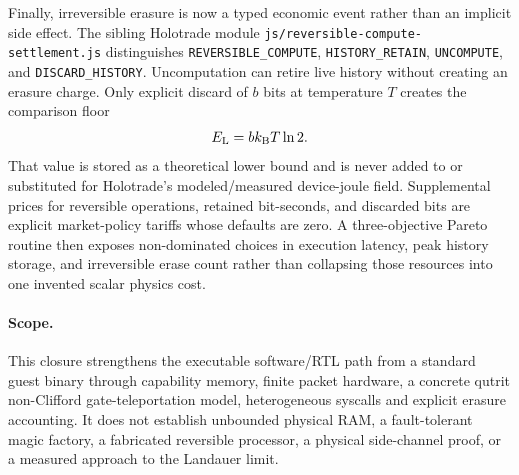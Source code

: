 Finally, irreversible erasure is now a typed economic event rather than an
implicit side effect.  The sibling Holotrade module
\texttt{js/reversible-compute-settlement.js} distinguishes
\texttt{REVERSIBLE\_COMPUTE}, \texttt{HISTORY\_RETAIN},
\texttt{UNCOMPUTE}, and \texttt{DISCARD\_HISTORY}.  Uncomputation can retire
live history without creating an erasure charge.  Only explicit discard of
$b$ bits at temperature $T$ creates the comparison floor
\[
 E_{\rm L}=b k_{\rm B}T\ln2.
\]
That value is stored as a theoretical lower bound and is never added to or
substituted for Holotrade's modeled/measured device-joule field.  Supplemental
prices for reversible operations, retained bit-seconds, and discarded bits are
explicit market-policy tariffs whose defaults are zero.  A three-objective
Pareto routine then exposes non-dominated choices in execution latency, peak
history storage, and irreversible erase count rather than collapsing those
resources into one invented scalar physics cost.

\paragraph{Scope.}
This closure strengthens the executable software/RTL path from a standard guest
binary through capability memory, finite packet hardware, a concrete qutrit
non-Clifford gate-teleportation model, heterogeneous syscalls and explicit
erasure accounting.  It does not establish unbounded physical RAM, a
fault-tolerant magic factory, a fabricated reversible processor, a physical
side-channel proof, or a measured approach to the Landauer limit.
